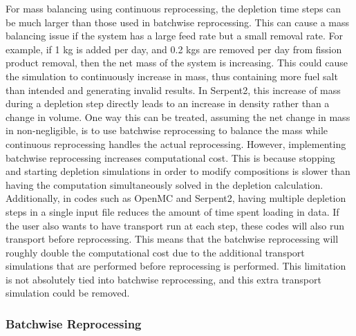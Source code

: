 For mass balancing using continuous reprocessing, the depletion time steps can be much larger than those used in batchwise reprocessing.
This can cause a mass balancing issue if the system has a large feed rate but a small removal rate. For example, if 1 kg is added per day, and 0.2 kgs are removed per day from fission product removal, then the net mass of the system is increasing. 
This could cause the simulation to continuously increase in mass, thus containing more fuel salt than intended and generating invalid results. In Serpent2, this increase of mass during a depletion step directly leads to an increase in density rather than a change in volume.
One way this can be treated, assuming the net change in mass in non-negligible, is to use batchwise reprocessing to balance the mass while continuous reprocessing handles the actual reprocessing.
However, implementing batchwise reprocessing increases computational cost. This is because stopping and starting depletion simulations in order to modify compositions is slower than having the computation simultaneously solved in the depletion calculation. Additionally, in codes such as OpenMC and Serpent2, having multiple depletion steps in a single input file reduces the amount of time spent loading in data. If the user also wants to have transport run at each step, these codes will also run transport before reprocessing. This means that the batchwise reprocessing will roughly double the computational cost due to the additional transport simulations that are performed before reprocessing is performed. This limitation is not absolutely tied into batchwise reprocessing, and this extra transport simulation could be removed.

\subsubsection{Batchwise Reprocessing}


